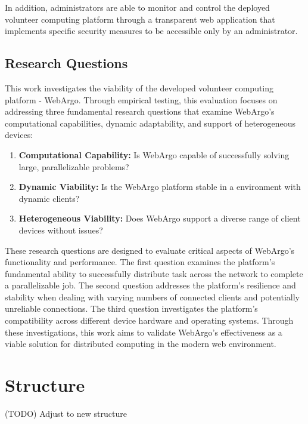 In addition, administrators are able to monitor and control the deployed volunteer computing platform through a transparent web application that implements specific security measures to be accessible only by an administrator.

\subsection{Research Questions}
\label{subsec:into:objectives:questions}
This work investigates the viability of the developed volunteer computing platform - WebArgo. Through empirical testing, this evaluation focuses on addressing three fundamental research questions that examine WebArgo's computational capabilities, dynamic adaptability, and support of heterogeneous devices:
\begin{enumerate}
    \item \textbf{Computational Capability:} Is WebArgo capable of successfully solving large, parallelizable problems?
    \item \textbf{Dynamic Viability:} Is the WebArgo platform stable in a environment with dynamic clients?
    \item \textbf{Heterogeneous Viability:} Does WebArgo support a diverse range of client devices without issues?
\end{enumerate}
These research questions are designed to evaluate critical aspects of WebArgo's functionality and performance. The first question examines the platform's fundamental ability to successfully distribute task across the network to complete a parallelizable job. The second question addresses the platform's resilience and stability when dealing with varying numbers of connected clients and potentially unreliable connections. The third question investigates the platform's compatibility across different device hardware and operating systems. Through these investigations, this work aims to validate WebArgo's effectiveness as a viable solution for distributed computing in the modern web environment.

\section{Structure}
\label{sec:intro:structure}
(TODO) Adjust to new structure

